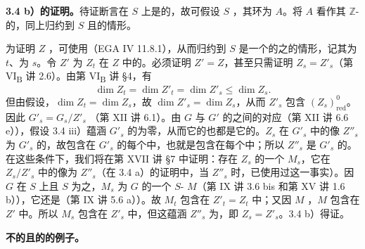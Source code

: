 \textbf{3.4 b）的证明。}待证断言在 $S$ 上是的，故可假设 $S$ ，其环为 $A$。将 $A$ 看作其 $\mathbb Z$-的，同上归约到 $S$ 且的情形。

为证明 $Z$ ，可使用（EGA IV 11.8.1），从而归约到 $S$ 是一个的之的情形，记其为 $t$、为 $s$。令 $Z'$ 为 $Z_t$ 在 $Z$ 中的。必须证明 $Z'=Z$，甚至只需证明 $Z_s=Z'_s$（第 VI\textsubscript{B} 讲 2.6）。由第 VI\textsubscript{B} 讲 §4，有
\[\dim Z_t=\dim Z'_t=\dim Z'_s\le\dim Z_s.\]
但由假设，$\dim Z_t=\dim Z_s$，故 $\dim Z'_s=\dim Z_s$，从而 $Z'_s$ 包含 $(Z_s)^0_{\mathrm{red}}$。因此 $G'_s=G_s/Z'_s$ （第 XII 讲 6.1）。由 $G$ 与 $G'$ 的之间的对应（第 XII 讲 6.6 e）），假设 3.4 iii）蕴涵 $G'_s$ 的为零，从而它的也都是它的。$Z_s$ 在 $G'_s$ 中的像 $Z''_s$ 为 $G'_s$ 的，故包含在 $G'_s$ 的每个中，也就是包含在每个中；所以 $Z''_s$ 是 $G'_s$ 的。在这些条件下，我们将在第 XVII 讲 §7 中证明：存在 $Z_s$ 的一个 $M_s$，它在 $Z_s/Z'_s$ 中的像为 $Z''_s$（在 3.4 a）的证明中，当 $Z''_s$ 时，已使用过这一事实）。因 $G$ 在 $S$ 上且 $S$ 为之，$M_s$ 为 $G$ 的一个 $S$- $M$（第 IX 讲 3.6 bis 和第 XV 讲 1.6 b）），它还是（第 IX 讲 5.6 a））。故 $M_t$ 包含在 $Z'_t=Z_t$ 中；又因 $M$ ，$M$ 包含在 $Z'$ 中。所以 $M_s$ 包含在 $Z'_s$ 中，但这蕴涵 $Z''_s$ 为，即 $Z_s=Z'_s$。3.4 b）得证。

\textbf{不的且的的例子。}

